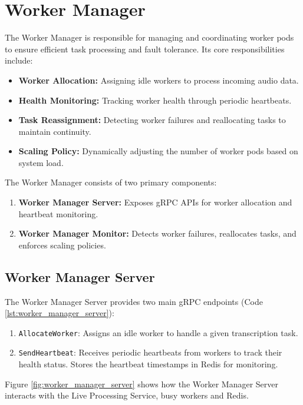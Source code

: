 \section{Worker Manager} \label{section:worker_manager}
The Worker Manager is responsible for managing and coordinating worker pods to ensure efficient task processing and fault tolerance. Its core responsibilities include:
\begin{itemize}
  \item \textbf{Worker Allocation:} Assigning idle workers to process incoming audio data.
  \item \textbf{Health Monitoring:} Tracking worker health through periodic heartbeats.
  \item \textbf{Task Reassignment:} Detecting worker failures and reallocating tasks to maintain continuity.
  \item \textbf{Scaling Policy:} Dynamically adjusting the number of worker pods based on system load.
\end{itemize}


The Worker Manager consists of two primary components:
\begin{enumerate}
    \item \textbf{Worker Manager Server:} Exposes gRPC APIs for worker allocation and heartbeat monitoring.
    \item \textbf{Worker Manager Monitor:} Detects worker failures, reallocates tasks, and enforces scaling policies.
\end{enumerate}

\subsection{Worker Manager Server}

The Worker Manager Server provides two main gRPC endpoints (Code \ref{lst:worker_manager_server}):
\begin{enumerate}
    \item \texttt{AllocateWorker}: Assigns an idle worker to handle a given transcription task.
    \item \texttt{SendHeartbeat}: Receives periodic heartbeats from workers to track their health status. Stores the heartbeat timestamps in Redis for monitoring.
\end{enumerate}

Figure \ref{fig:worker_manager_server} shows how the Worker Manager Server interacts with the Live Processing Service, busy workers and Redis.

